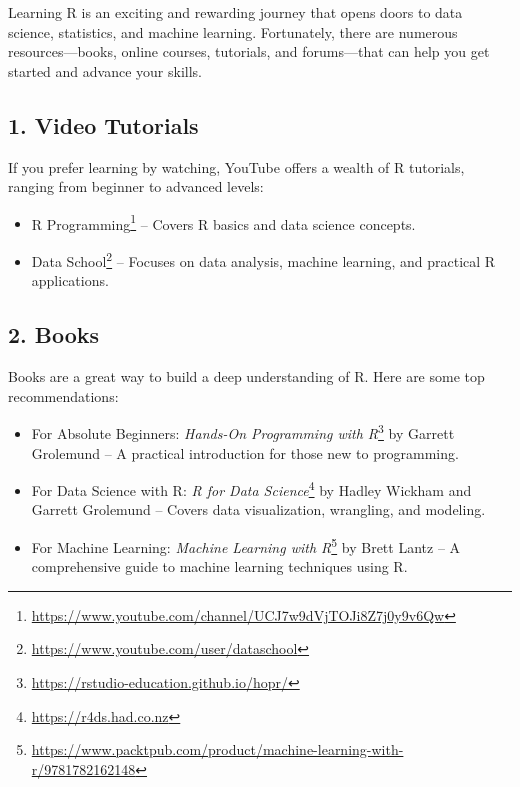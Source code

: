 \documentclass[
  11pt,
]{book}
\providecommand{\tightlist}{%
  \setlength{\itemsep}{0pt}\setlength{\parskip}{0pt}}
\renewcommand{\href}[2]{#2\footnote{\url{#1}}}
\theoremstyle{definition}
\theoremstyle{definition}
\theoremstyle{definition}
\theoremstyle{definition}
\theoremstyle{remark}
\begin{document}
Learning R is an exciting and rewarding journey that opens doors to data science, statistics, and machine learning. Fortunately, there are numerous resources---books, online courses, tutorials, and forums---that can help you get started and advance your skills.

\subsection*{1. Video Tutorials}\label{video-tutorials}


If you prefer learning by watching, YouTube offers a wealth of R tutorials, ranging from beginner to advanced levels:

\begin{itemize}
\tightlist
\item
  \href{https://www.youtube.com/channel/UCJ7w9dVjTOJi8Z7j0y9v6Qw}{R Programming} -- Covers R basics and data science concepts.\\
\item
  \href{https://www.youtube.com/user/dataschool}{Data School} -- Focuses on data analysis, machine learning, and practical R applications.
\end{itemize}

\subsection*{2. Books}\label{books}


Books are a great way to build a deep understanding of R. Here are some top recommendations:

\begin{itemize}
\tightlist
\item
  For Absolute Beginners: \href{https://rstudio-education.github.io/hopr/}{\emph{Hands-On Programming with R}} by Garrett Grolemund\citep{grolemund2014hands} -- A practical introduction for those new to programming.\\
\item
  For Data Science with R: \href{https://r4ds.had.co.nz}{\emph{R for Data Science}} by Hadley Wickham and Garrett Grolemund \citep{wickham2017r} -- Covers data visualization, wrangling, and modeling.\\
\item
  For Machine Learning: \href{https://www.packtpub.com/product/machine-learning-with-r/9781782162148}{\emph{Machine Learning with R}} by Brett Lantz\citep{lantz2013machine} -- A comprehensive guide to machine learning techniques using R.
\end{itemize}
\end{document}
